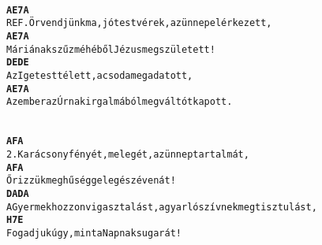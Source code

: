 \cleardoublepage
{}
\kottastart
{}
\kottaend
\begin{minipage}{\textwidth}
\begin{alltt}
\textbf{     }
\textbf{     A                               E7             A}
REF. Örvendjünk ma, jó testvérek, az ünnep elérkezett,
\textbf{      A                     E7            A}
     Máriának szűz méhéből Jézus megszületett!
\textbf{        D           E        D          E}
     Az Ige testté lett, a csoda megadatott,
\textbf{     A                             E7          A}
     Az ember az Úrnak irgalmából megváltót kapott.
\end{alltt}
\vspace{0.0cm}
\versszakspacing
\end{minipage}
\begin{minipage}{\textwidth}
\begin{alltt}
\textbf{   }
\textbf{   A                             F            A}
2. Karácsony fényét, melegét, az ünnep tartalmát,
\textbf{   A                    F          A}
   Őrizzük meg hűséggel egész éven át!
\textbf{       D             A                D             A}
   A Gyermek hozzon vigasztalást, a gyarló szívnek megtisztulást,
\textbf{    H7                   E}
   Fogadjuk úgy, mint a Napnak sugarát!
\end{alltt}
\vspace{0.0cm}
\versszakspacing
\end{minipage}
~\vspace{1.0cm}
\newline
